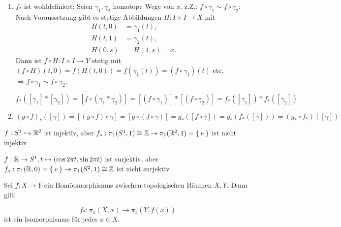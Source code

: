 \begin{beweis}\leavevmode
    \begin{enumerate}[label=\alph*)]
        \item $f_*$ ist wohldefiniert: Seien $\gamma_1, \gamma_2$ homotope
              Wege von $x$. z.Z.: $f \circ \gamma_1 \sim f \circ \gamma_2$:
              Nach Voraussetzung gibt es stetige Abbildungen $H:I\times I \rightarrow X$
              mit 
              \begin{align*}
                H(t,0) &= \gamma_1(t),\\
                H(t,1) &= \gamma_2(t),\\
                H(0,s) &= H(1, s) = x\text{.}
              \end{align*}
              Dann ist $f \circ H: I \times I \rightarrow Y$ stetig mit
              $(f \circ H)(t,0) = f(H(t,0)) = f(\gamma_1(t)) = (f \circ \gamma_1)(t)$
              etc. $\Rightarrow f \circ \gamma_1 \sim f \circ \gamma_2$.

              $f_*([\gamma_1] * [\gamma_2]) = [f \circ (\gamma_1 * \gamma_2)] = [(f \circ \gamma_1)] * [(f \circ \gamma_2)] = f_*([\gamma_1]) * f_*([\gamma_2])$
        \item $(g \circ f)_* ([\gamma]) = [(g \circ f) \circ \gamma] = [g \circ (f \circ \gamma)] = g_* ([f \circ \gamma]) = g_* (f_* ([\gamma])) = (g_* \circ f_*)([\gamma])$
    \end{enumerate}
\end{beweis}

\begin{beispiel}
    \begin{bspenum}
        \item $f:S^1 \hookrightarrow \mathbb{R}^2$ ist injektiv, aber 
              $f_*:\pi_1(S^1, 1) \cong \mathbb{Z} \rightarrow \pi_1(\mathbb{R}^2, 1) = \Set{e}$
              ist nicht injektiv
        \item $f: \mathbb{R} \rightarrow S^1, t \mapsto (\cos 2 \pi t, \sin 2 \pi t)$
              ist surjektiv, aber $f_*: \pi_1(\mathbb{R}, 0) = \Set{e} \rightarrow \pi_1(S^2, 1) \cong \mathbb{Z}$
              ist nicht surjektiv
    \end{bspenum}
\end{beispiel}

\begin{bemerkung}%
    Sei $f:X \rightarrow Y$ ein Homöomorphismus zwischen topologischen
    Räumen $X, Y$. Dann gilt:

    \[f_*: \pi_1(X,x) \rightarrow \pi_1(Y, f(x))\]
    ist ein Isomorphismus für jedes $x \in X$.
\end{bemerkung}

